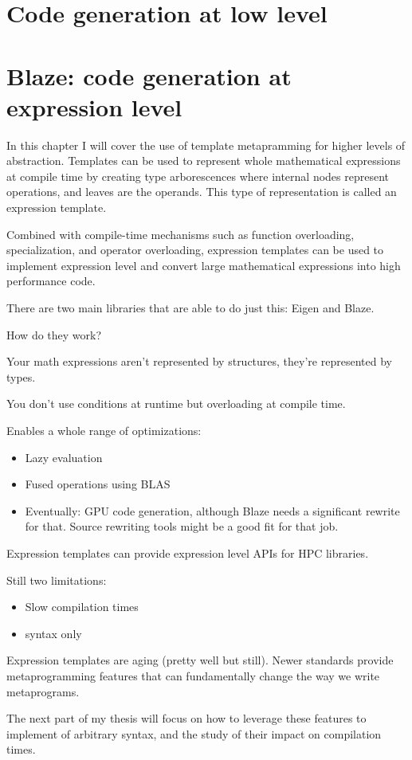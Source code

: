\documentclass[../../main.tex]{subfiles}
\begin{document}
\chapter{Code generation at low level}

% 

\chapter{Blaze: code generation at expression level}

In this chapter I will cover the use of template metapramming for higher levels
of abstraction. Templates can be used to represent whole mathematical
expressions at compile time by creating type arborescences where internal
nodes represent operations, and leaves are the operands. This type of
representation is called an expression template\cite{veldhuizen:1995}.

Combined with compile-time mechanisms such as function overloading,
specialization, and operator overloading, expression templates can be used to
implement expression level \dsels and convert large mathematical expressions
into high performance code.

There are two main libraries that are able to do just this: Eigen\cite{eigen}
and Blaze\cite{blazelib}.



How do they work?

Your math expressions aren't represented by structures,
they're represented by types.

You don't use conditions at runtime but overloading at compile time.

Enables a whole range of optimizations:

\begin{itemize}
\item Lazy evaluation
\item Fused operations using BLAS
\item Eventually: GPU code generation, although Blaze needs a significant
      rewrite for that. Source rewriting tools might be a good fit for that job.
\end{itemize}

Expression templates can provide expression level APIs for HPC libraries.

Still two limitations:

\begin{itemize}
\item Slow compilation times
\item \cpp syntax only
\end{itemize}

Expression templates are aging (pretty well but still).
Newer \cpp standards provide metaprogramming features that can fundamentally
change the way we write metaprograms.

The next part of my thesis will focus on how to leverage these features to
implement \dsel of arbitrary syntax, and the study of their impact on
compilation times.
\end{document}
